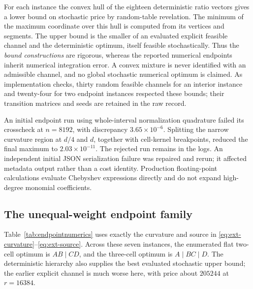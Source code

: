 For each instance the convex hull of the eighteen deterministic ratio
vectors gives a lower bound on stochastic price by random-table revelation.
The minimum of the maximum coordinate over this hull is computed from its
vertices and segments. The upper bound is the smaller of an evaluated
explicit feasible channel and the deterministic optimum, itself feasible
stochastically. Thus the \emph{bound constructions} are rigorous, whereas the
reported numerical endpoints inherit numerical integration error. A convex
mixture is never identified with an admissible channel, and no global
stochastic numerical optimum is claimed. As implementation checks, thirty
random feasible channels for an interior instance and twenty-four for two
endpoint instances respected these bounds; their transition matrices and
seeds are retained in the raw record.

An initial endpoint run using whole-interval normalization quadrature failed
its crosscheck at $n=8192$, with discrepancy $3.65\times10^{-6}$. Splitting
the narrow curvature region at $d/4$ and $d$, together with cell-kernel
breakpoints, reduced the final maximum to $2.03\times10^{-11}$. The rejected
run remains in the logs. An independent initial JSON serialization failure
was repaired and rerun; it affected metadata output rather than a cost
identity. Production floating-point calculations evaluate Chebyshev
expressions directly and do not expand high-degree monomial coefficients.

\subsection{The unequal-weight endpoint family}
Table~\ref{tab:endpointnumerics} uses exactly the curvature and source in
\eqref{eq:ext-curvature}--\eqref{eq:ext-source}. Across these seven instances,
the enumerated flat two-cell optimum is $AB\mid CD$, and the three-cell
optimum is $A\mid BC\mid D$. The deterministic hierarchy also supplies the
best evaluated stochastic upper bound; the earlier explicit channel is
much worse here, with price about $205244$ at $r=16384$.

